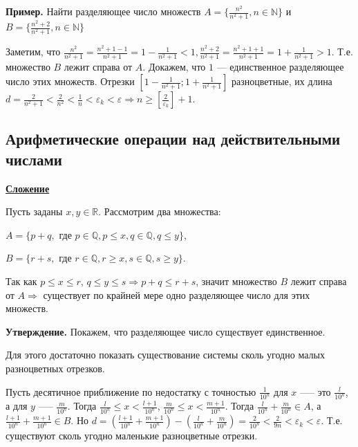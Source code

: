 \documentclass{article}
\begin{document}
        \textbf{Пример.} Найти разделяющее число множеств $A = \{ \frac{n^2}{n^2 + 1}, n \in \mathbb{N} \}$ и $B = \{ \frac{n^2 + 2}{n^2 + 1}, n \in \mathbb{N} \}$

        Заметим, что $\frac{n^2}{n^2 + 1} = \frac{n^2 + 1 - 1}{n^2 + 1} = 1 - \frac{1}{n^2 + 1} < 1, \frac{n^2 + 2}{n^2 + 1} = \frac{n^2 + 1 + 1}{n^2 + 1} = 1 + \frac{1}{n^2 + 1} > 1$. Т.е. множество $B$ лежит справа от $A$. Докажем, что $1$ --- единственное разделяющее число этих множеств. Отрезки $[1 - \frac{1}{n^2 + 1}; 1 + \frac{1}{n^2 + 1}]$ разноцветные, их длина $d = \frac{2}{n^2 + 1} < \frac{2}{n^2} < \frac{1}{n} < \varepsilon_k < \varepsilon \Rightarrow n \geq [\frac{2}{\varepsilon_k}] + 1$.

        \subsection{Арифметические операции над действительными числами}

        \textbf{\underline{Сложение}}
        
        Пусть заданы $x, y \in \mathbb{R}$. Рассмотрим два множества:

        $A = \{p + q, \textrm{ где } p \in \mathbb{Q}, p \leq x, q \in \mathbb{Q}, q \leq y\}$, 

        $B = \{r + s, \textrm{ где } r \in \mathbb{Q}, r \geq x, s \in \mathbb{Q}, s \geq y\}$.

        Так как $p \leq x \leq r$, $q \leq y \leq s \Rightarrow p + q \leq r + s$, значит множество $B$ лежит справа от $A \Rightarrow$ существует по крайней мере одно разделяющее число для этих множеств. 

        \textbf{Утверждение.} Покажем, что разделяющее число существует единственное.

        Для этого достаточно показать существование системы сколь угодно малых разноцветных отрезков. 

        Пусть десятичное приближение по недостатку с точностью $\frac{1}{10^n}$ для $x$ --— это $\frac{l}{10^n}$, а для $y$ --— $\frac{m}{10^n}$. Тогда $\frac{l}{10^n} \leq x < \frac{l + 1}{10^n}$, $\frac{m}{10^n} \leq x < \frac{m + 1}{10^n}$. Тогда $\frac{l}{10^n} + \frac{m}{10^n} \in A$, а $\frac{l + 1}{10^n} + \frac{m + 1}{10^n} \in B$. Но $d = (\frac{l + 1}{10^n} + \frac{m + 1}{10^n}) - (\frac{l}{10^n} + \frac{m}{10^n}) = \frac{2}{10^n} < \frac{2}{9n} < \varepsilon_k < \varepsilon$. Т.е. существуют сколь угодно маленькие разноцветные отрезки. 
\end{document}
